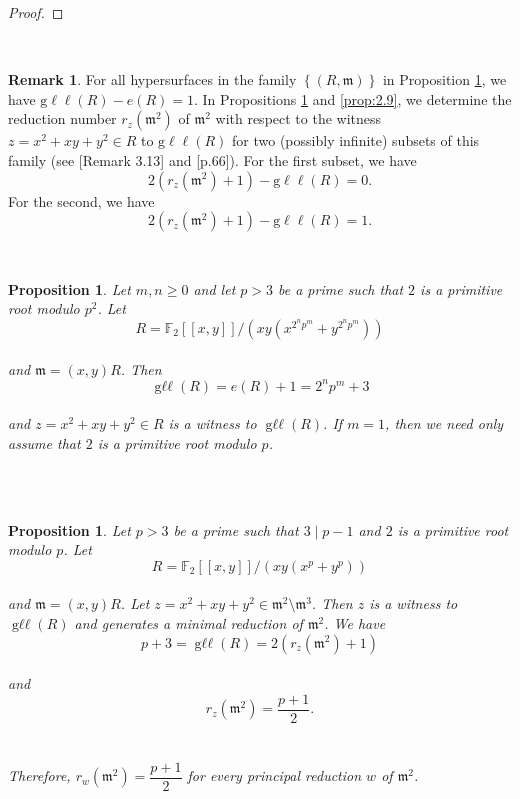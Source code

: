 \documentclass{amsart}
\newtheorem{proposition}[theorem]{Proposition}
\theoremstyle{definition}
\theoremstyle{definition}
\newtheorem{remark}[theorem]{Remark}
\numberwithin{equation}{section}
\theoremstyle{definition}
\DeclareMathOperator{\Gll}{g\ell\ell}
\begin{document}
{\begin{proof}
\end{proof}
\text{}\\
\begin{remark}
For all hypersurfaces in the family $\left\{(R,\mathfrak{m}) \right\}$ in Proposition \ref{prop:2.6}, we have $
\text{g}\ell\ell(R)-e(R)=1$. In Propositions \ref{prop:2.8} and \ref{prop:2.9}, we determine the reduction number $r_{z}(\mathfrak{m}^2)$ of $\mathfrak{m}^2$ with respect to the witness $z=x^2+xy+y^2 \in R$ to $\text{g}\ell\ell(R)$ for two (possibly infinite) subsets of this family (see \cite{Bartels24}[Remark 3.13] and \cite{CDR04}[p.66]). For the first subset, we have \\ 
\[
2(r_{z}(\mathfrak{m}^2) +1)-\text{g}\ell\ell(R)=0.
\]
For the second, we have 
\[
2(r_{z}(\mathfrak{m}^2) +1)-\text{g}\ell\ell(R)=1.
\]
\end{remark} \text{}\\
\begin{proposition}\cite[Proposition 3.12]{Bartels24}\label{prop:2.6}
Let $m, n \geq 0$ and let $p>3$ be a prime such that $2$ is a primitive root modulo $p^2$. Let \\
\[
R=\mathbb{F}_2[[x,y]] \bigg/ \left(xy \left(x^{2^n p^m} + y^{2^n p^m} \right)\right)
\] \text{}\\ and $\mathfrak{m}=(x,y)R$.
Then \\
\[
\Gll(R)=e(R)+1=2^n p^m +3
\] \text{}\\ and $z=x^2+xy+y^2 \in R$ is a witness to $\Gll(R)$. If $m=1$, then we need only assume that $2$ is a primitive root modulo $p$.
\end{proposition} \text{}\\\\
\begin{proposition}\label{prop:2.8}
Let $p>3$ be a prime such that $3 \mid p-1$ and $2$ is a primitive root modulo $p$. Let \\
\[
R=\mathbb{F}_2[[x,y]] \bigg/ \left(xy \left(x^p + y^p \right) \right)
\] \text{}\\ and $\mathfrak{m}=(x,y)R$. Let $z=x^2 + xy + y^2 \in \mathfrak{m}^2 \setminus \mathfrak{m}^3$. Then $z$ is a witness to $\Gll(R)$ and generates a minimal reduction of $\mathfrak{m}^2$. We have \\
\[
p+3=\Gll(R)=2 \left(r_{z}(\mathfrak{m}^2) + 1 \right)
\] \text{}\\ and
\[
r_{z}(\mathfrak{m}^2) = \dfrac{p+1}{2}.
\] 
\text{}\\\\
Therefore, $r_{w}(\mathfrak{m}^2)=\dfrac{p+1}{2}$ for every principal reduction $w$ of $\mathfrak{m}^2$.

\end{proposition}}
\end{document}
